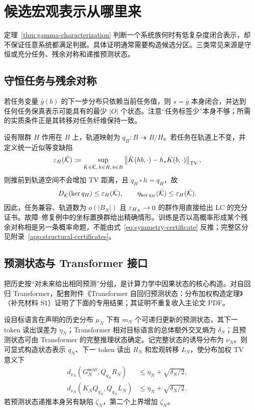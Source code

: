 \section{候选宏观表示从哪里来}
\label{sec:construction}

定理~\ref{thm:gamma-characterization} 判断一个系统族何时有低复杂度闭合表示，却不保证任意系统都满足判据。具体证明通常需要构造候选分区。三类常见来源是守恒或充分任务、残余对称和递推预测状态。

\subsection{守恒任务与残余对称}

若任务变量 $\bar g(b)$ 的下一步分布只依赖当前任务值，则 $s=\bar g$ 本身闭合，并达到任何任务保真表示可能具有的最少 $|O|$ 个状态。注意“任务标签少”本身不够；所需的实质条件正是其转移对任务纤维保持一致。

设有限群 $H$ 作用在 $B$ 上，轨道映射为 $q_H:B\twoheadrightarrow B/H$。若任务在轨道上不变，并定义统一近似等变缺陷
\[
\varepsilon_H(\bar{\mathcal K})
:=
\sup_{\bar K\in\bar{\mathcal K},\,h\in H,\,b\in B}
\left\|\bar K(hb,\cdot)-h_*\bar K(b,\cdot)\right\|_{\operatorname{TV}},
\]
则推前到轨道空间不会增加 TV 距离，且 $q_H\circ h=q_H$，故
\begin{equation}
D_{\bar{\mathcal K}}(\ker q_H)\le\varepsilon_H(\bar{\mathcal K}),
\qquad
\eta_{\ker q_H}(\bar{\mathcal K})\le\varepsilon_H(\bar{\mathcal K}).
\label{eq:symmetry-certificate}
\end{equation}
因此，任务兼容、轨道数为 $o(|B_N|)$ 且 $\varepsilon_{H_N}\to0$ 的群作用直接给出 LC 的充分证书。故障--修复例中的坐标置换群给出精确情形。训练是否以高概率形成某个残余对称相是另一条概率命题，不能由式~\eqref{eq:symmetry-certificate} 反推；完整区分见附录~\ref{app:structural-certificates}。

\subsection{预测状态与 Transformer 接口}

把历史按“对未来给出相同预测”分组，是计算力学中因果状态的核心构造\citep{CrutchfieldYoung1989,ShaliziCrutchfield2001}。对自回归 Transformer\citep{VaswaniEtAl2017}，配套附件《Transformer 自回归预测状态：分布加权构造定理》（补充材料 S1）证明了下面的专用结果；其证明不重复收入主论文 PDF。

\begin{theorem}
\label{thm:transformer-interface}
设目标语言在声明的历史分布 $\mu_N$ 下有 $m_N$ 个可递归更新的预测状态，其下一 token 读出误差为 $\eta_N$；Transformer 相对目标语言的总体额外交叉熵为 $\delta_N$；且预测状态可由 Transformer 的完整推理状态确定。记完整状态的诱导分布为 $\nu_N$。则可显式构造状态表示 $q_N$、下一 token 读出 $R_N$ 和宏观转移 $L_N$，使分布加权 TV 意义下
\begin{align}
d_{\nu_N}(G_N^{\mathrm{next}},Q_{q_N}R_N)
&\le \eta_N+\sqrt{\delta_N/2},\label{eq:transformer-readout}\\
d_{\nu_N}(K_NQ_{q_N},Q_{q_N}L_N)
&\le \eta_N+\sqrt{\delta_N/2}.
\label{eq:transformer-closure}
\end{align}
若预测状态递推本身另有缺陷 $\zeta_N$，第二个上界增加 $\zeta_N$。
\end{theorem}

